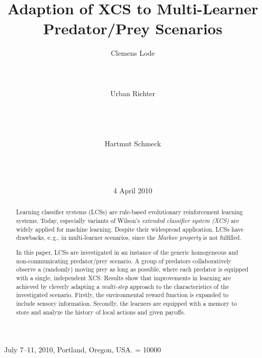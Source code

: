 \documentclass{sig-alternate}
\begin{document}
 {July 7--11, 2010, Portland, Oregon, USA.} 
\widowpenalty = 10000 

\title{Adaption of XCS to Multi-Learner Predator/Prey Scenarios}



 \author{
	\alignauthor
		Clemens Lode \\
     \\
     \\
     \\
	\alignauthor
		Urban Richter \\
     \\
     \\
     \\
     \\
	\alignauthor
		Hartmut Schmeck \\
    \\
    \\
    \\
}

\date{4 April 2010}

\maketitle

%

\begin{abstract}

Learning classifier systems (LCSs) are rule-based evolutionary reinforcement learning systems. Today, especially variants of Wilson's \emph{extended classifier system (XCS)} are widely applied for machine learning. Despite their widespread application, LCSs have drawbacks, e.\,g., in multi-learner scenarios, since the \emph{Markov property} is not fulfilled. 

In this paper, LCSs are investigated in an instance of the generic homogeneous and non-communicating predator/prey scenario. A group of predators collaboratively observe a (randomly) moving prey as long as possible, where each predator is equipped with a single, independent XCS. Results show that improvements in learning are achieved by cleverly adapting a \emph{multi-step} approach to the characteristics of the investigated scenario. Firstly, the environmental reward function is expanded to include sensory information. Secondly, the learners are equipped with a memory to store and analyze the history of local actions and given payoffs.

\end{abstract}
\end{document}
